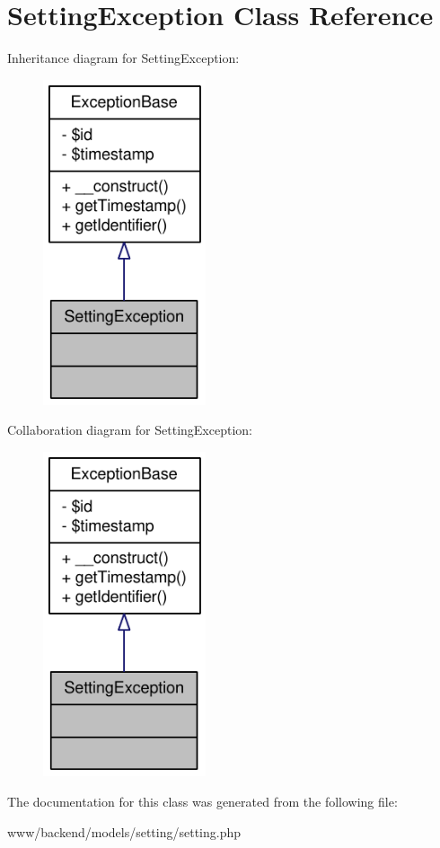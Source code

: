 \hypertarget{classSettingException}{
\section{SettingException Class Reference}
\label{classSettingException}
}


Inheritance diagram for SettingException:\nopagebreak
\begin{figure}[H]
\begin{center}
\leavevmode
\includegraphics[width=136pt]{classSettingException__inherit__graph}
\end{center}
\end{figure}


Collaboration diagram for SettingException:\nopagebreak
\begin{figure}[H]
\begin{center}
\leavevmode
\includegraphics[width=136pt]{classSettingException__coll__graph}
\end{center}
\end{figure}


The documentation for this class was generated from the following file:\begin{DoxyCompactItemize}
\item 
www/backend/models/setting/setting.php\end{DoxyCompactItemize}
